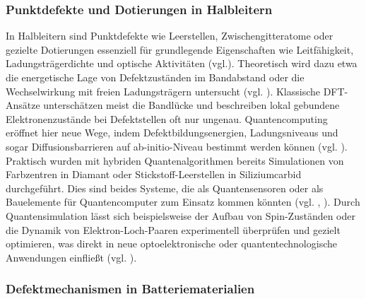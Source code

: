 \subsubsection{Punktdefekte und Dotierungen in Halbleitern}

In Halbleitern sind Punktdefekte wie Leerstellen, Zwischengitteratome oder gezielte Dotierungen essenziell für grundlegende Eigenschaften wie Leitfähigkeit, Ladungsträgerdichte und optische Aktivitäten (vgl.\cite{bassett_quantum_2019}). Theoretisch wird dazu etwa die energetische Lage von Defektzuständen im Bandabstand oder die Wechselwirkung mit freien Ladungsträgern untersucht (vgl. \cite{freysoldt_first-principles_2014}). Klassische DFT-Ansätze unterschätzen meist die Bandlücke und beschreiben lokal gebundene Elektronenzustände bei Defektstellen oft nur ungenau. Quantencomputing eröffnet hier neue Wege, indem Defektbildungsenergien, Ladungsniveaus und sogar Diffusionsbarrieren auf ab-initio-Niveau bestimmt werden können (vgl. \cite{bassett_quantum_2019}).
Praktisch wurden mit hybriden Quantenalgorithmen bereits Simulationen von Farbzentren in Diamant oder Stickstoff-Leerstellen in Siliziumcarbid durchgeführt. Dies sind beides Systeme, die als Quantensensoren oder als Bauelemente für Quantencomputer zum Einsatz kommen könnten  (vgl. \cite{baker_simulating_2024}, \cite{cao_ab_2023}). Durch Quantensimulation lässt sich beispielsweise der Aufbau von Spin-Zuständen oder die Dynamik von Elektron-Loch-Paaren experimentell überprüfen und gezielt optimieren, was direkt in neue optoelektronische oder quantentechnologische Anwendungen einfließt (vgl. \cite{cao_ab_2023}).

\subsubsection{Defektmechanismen in Batteriematerialien}

